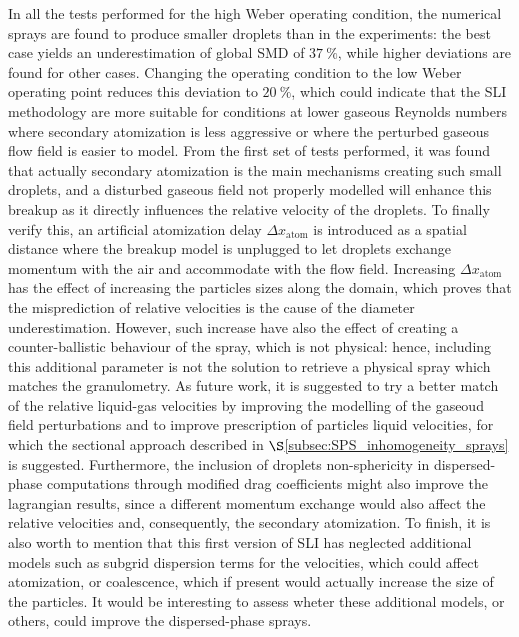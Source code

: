 In all the tests performed for the high Weber operating condition, the numerical sprays are found to produce smaller droplets than in the experiments: the best case yields an underestimation of global SMD of $37~\%$, while higher deviations are found for other cases. Changing the operating condition to the low Weber operating point reduces this deviation to $20~\%$, which could indicate that the SLI methodology are more suitable for conditions at lower gaseous Reynolds numbers where secondary atomization is less aggressive or where the perturbed gaseous flow field is easier to model. From the first set of tests performed, it was found that actually secondary atomization is the main mechanisms creating such small droplets, and a disturbed gaseous field not properly modelled will enhance this breakup as it directly influences the relative velocity of the droplets. To finally verify this, an artificial atomization delay $\Delta x_\mathrm{atom}$ is introduced as a spatial distance where the breakup model is unplugged to let droplets exchange momentum with the air and accommodate with the flow field. Increasing $\Delta x_\mathrm{atom}$ has the effect of increasing the particles sizes along the domain, which proves that the misprediction of relative velocities is the cause of the diameter underestimation. However, such increase have also the effect of creating a counter-ballistic behaviour of the spray, which is not physical: hence, including this additional parameter is not the solution to retrieve a physical spray which matches the granulometry. As future work, it is suggested to try a better match of the relative liquid-gas velocities by improving the modelling of the gaseoud field perturbations and to improve prescription of particles liquid velocities, for which the sectional approach described in $\S$\ref{subsec:SPS_inhomogeneity_sprays} is suggested. Furthermore, the inclusion of droplets non-sphericity in dispersed-phase computations through modified drag coefficients might also improve the lagrangian results, since a different momentum exchange would also affect the relative velocities and, consequently, the secondary atomization. To finish, it is also worth to mention that this first version of SLI has neglected additional models such as subgrid dispersion terms for the velocities, which could affect atomization, or coalescence, which if present would actually increase the size of the particles. It would be interesting to assess wheter these additional models, or others, could improve the dispersed-phase sprays.


